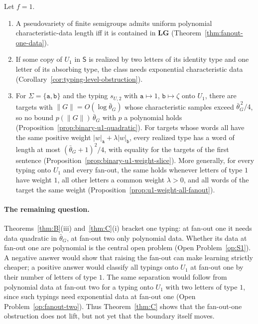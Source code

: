 \begin{mainthm}
\label{thm:B}
Let $f=1$.
\begin{enumerate}[label=\textup{(\roman*)},leftmargin=*]
\item A pseudovariety of finite semigroups admits uniform polynomial
characteristic-data length iff it is contained in $\mathbf{LG}$
\textup(Theorem~\ref{thm:fanout-one-data}\textup).
\item If some copy of $U_1$ in $\mathsf S$ is realized by two letters of its
identity type and one letter of its absorbing type, the class needs
exponential characteristic data
\textup(Corollary~\ref{cor:typing-level-obstruction}\textup).
\item For $\Sigma=\{\mathtt a,\mathtt b\}$ and the typing $s_{U,2}$ with
$\mathtt a\mapsto1$, $\mathtt b\mapsto\zeta$ onto $U_1$, there are targets with
$\|G\|=O(\log\bar\theta_G)$ whose characteristic samples exceed
$\bar\theta_G^{\,2}/4$, so no bound $p(\|G\|)\,\bar\theta_G$ with $p$ a polynomial
holds \textup(Proposition~\ref{prop:binary-u1-quadratic}\textup).  For targets
whose words all have the same positive weight $|w|_{\mathtt a}+\lambda|w|_{\mathtt b}$,
every realized type has a word of length at most $(\bar\theta_G+1)^2/4$, with
equality for the targets of the first sentence \textup(Proposition~\ref{prop:binary-u1-weight-slice}\textup).
More generally, for every typing onto $U_1$ and every fan-out, the same holds
whenever letters of type $1$ have weight $1$, all other letters a common weight
$\lambda>0$, and all words of the target the same weight
\textup(Proposition~\ref{prop:u1-weight-all-fanout}\textup).
\end{enumerate}
\end{mainthm}

\paragraph{The remaining question.}
Theorems~\ref{thm:B}(iii) and~\ref{thm:C}(i) bracket one typing: at fan-out one
it needs data quadratic in $\bar\theta_G$, at fan-out two only polynomial data.
Whether its data at fan-out one are polynomial is the central open problem
(Open Problem~\ref{op:S1}).  A negative answer would show that raising the
fan-out can make learning strictly cheaper; a positive answer would classify
all typings onto $U_1$ at fan-out one by their number of letters of type $1$.
The same separation would follow from polynomial data at fan-out two for a
typing onto $U_1$ with two letters of type $1$, since such typings need
exponential data at fan-out one (Open Problem~\ref{op:fanout-two}).  Thus
Theorem~\ref{thm:C} shows that the fan-out-one obstruction does not lift, but
not yet that the boundary itself moves.

